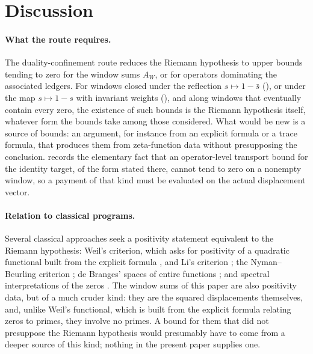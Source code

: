 \section{Discussion}
\label{sec:discussion}

\paragraph{What the route requires.}
The duality-confinement route reduces the Riemann hypothesis to upper
bounds tending to zero for the window sums \(A_W\), or for operators
dominating the associated ledgers.  For windows closed under the
reflection \(s\mapsto1-\bar s\) (), or under the map \(s\mapsto1-s\) with invariant weights
(), and along windows that eventually
contain every zero, the existence of such bounds is the Riemann
hypothesis itself, whatever form the bounds take among those
considered.  What would be new is a source of bounds: an argument, for
instance from an explicit formula or a trace formula, that produces
them from zeta-function data without presupposing the conclusion.
 records the elementary fact that an operator-level transport bound for
the identity target, of the form stated there, cannot tend to zero on a
nonempty window, so a payment of that kind must be evaluated on the
actual displacement vector.

\paragraph{Relation to classical programs.}
Several classical approaches seek a positivity statement equivalent to
the Riemann hypothesis: Weil's criterion, which asks for positivity of
a quadratic functional built from the explicit formula
\citep{Weil1952,Bombieri2000}, and Li's criterion \citep{Li1997}; the Nyman--Beurling criterion
\citep{Nyman1950,Beurling1955,BaezDuarte2003}; de Branges' spaces of
entire functions \citep{deBranges1968,deBranges1986}; and spectral
interpretations of the zeros \citep{BerryKeating1990,Connes1999}.  The window sums of this paper are also positivity data, but of a much
cruder kind: they are the squared displacements themselves, and, unlike Weil's functional, which is built from the explicit
formula relating zeros to primes, they involve no primes.  A bound
for them that did not presuppose the Riemann hypothesis would presumably
have to come from a deeper source of this kind; nothing in the present paper
supplies one.

